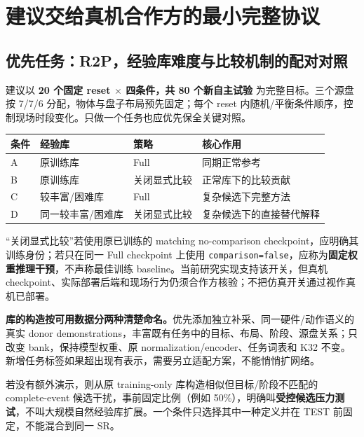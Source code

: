 
\section{建议交给真机合作方的最小完整协议}
\subsection{优先任务：R2P，经验库难度与比较机制的配对对照}
建议以 \textbf{20 个固定 reset $\times$ 四条件，共 80 个新自主试验} 为完整目标。三个源盘按 7/7/6 分配，物体与盘子布局预先固定；每个 reset 内随机/平衡条件顺序，控制现场时段变化。只做一个任务也应优先保全关键对照。

\small\begin{center}\begin{tabular}{P{1.3cm}P{4.5cm}P{4.3cm}P{4.9cm}}\toprule
条件 & 经验库 & 策略 & 核心作用\\\midrule
A & 原训练库 & Full & 同期正常参考\\
B & 原训练库 & 关闭显式比较 & 正常库下的比较贡献\\
C & 较丰富/困难库 & Full & 复杂候选下完整方法\\
D & 同一较丰富/困难库 & 关闭显式比较 & 复杂候选下的直接替代解释\\\bottomrule
\end{tabular}\end{center}\normalsize

“关闭显式比较”若使用原已训练的 matching no-comparison checkpoint，应明确其训练身份；若只在同一 Full checkpoint 上使用 \texttt{comparison=false}，应称为\textbf{固定权重推理干预}，不声称最佳训练 baseline。当前研究实现支持该开关，但真机 checkpoint、实际部署后端和现场行为仍须合作方核验；不把仿真开关通过视作真机已部署。

\textbf{库的构造按可用数据分两种清楚命名。}优先添加独立补采、同一硬件/动作语义的真实 donor demonstrations，丰富既有任务中的目标、布局、阶段、源盘关系；只改变 bank，保持模型权重、原 normalization/encoder、任务词表和 K32 不变。新增任务标签如果超出现有表示，需要另立适配方案，不能悄悄扩网络。

若没有额外演示，则从原 training-only 库构造相似但目标/阶段不匹配的 complete-event 候选干扰，事前固定比例（例如 50\%），明确叫\textbf{受控候选压力测试}，不叫大规模自然经验库扩展。一个条件只选择其中一种定义并在 TEST 前固定，不能混合到同一 SR。

